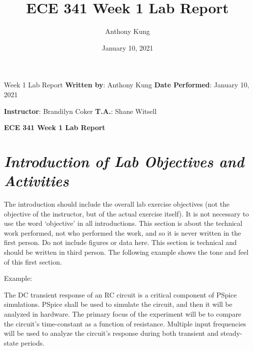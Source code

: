 \documentclass{article}
\title{ECE 341 Week 1 Lab Report} %
\author{
  Anthony Kung %
}
\date{January 10, 2021} %
\begin{document}
\selectfont


Week 1 Lab Report %
\newline
\textbf{Written by}: Anthony Kung %
\hfill
\textbf{Date Performed}: January 10, 2021 %

\textbf{Instructor}:  Brandilyn Coker
\hfill
\textbf{T.A.}: Shane Witsell

\begin{center}
  \large\textbf{ECE 341 Week 1 Lab Report} %
  \\
\end{center}

\setlength{\parskip}{1em}


\section{\textbf{\textit{Introduction of Lab Objectives and Activities}}}

The introduction should include the overall lab exercise objectives (not the objective of the instructor, but of the actual exercise itself). It is not necessary to use the word ‘objective’ in all introductions. This section is about the technical work performed, not who performed the work, and so it is never written in the first person. Do not include figures or data here. This section is technical and should be written in third person. The following example shows the tone and feel of this first section.

Example:

The DC transient response of an RC circuit is a critical component of PSpice simulations. PSpice shall be used to simulate the circuit, and then it will be analyzed in hardware. The primary focus of the experiment will be to compare the circuit’s time-constant as a function of resistance. Multiple input frequencies will be used to analyze the circuit’s response during both transient and steady-state periods.
\end{document}
